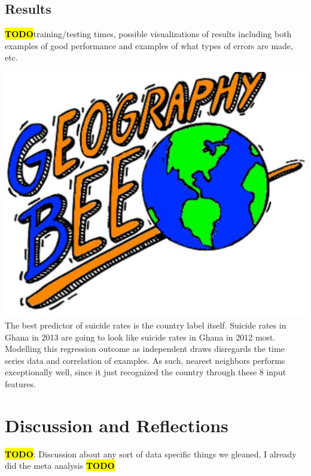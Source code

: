 \documentclass{article}
\newcommand{\TODO}{\textcolor{red}{\textbf{\hl{TODO}}}}
\begin{document}
\begin{multicols}{2}
\subsection{Results}
\TODO training/testing times, possible visualizations of results including both examples of good
performance and examples of what types of errors are made, etc.

\includegraphics[width=\columnwidth]{geo-bee.jpg}
The best predictor of suicide rates is the country label itself. Suicide rates in Ghana in 2013 are going to look like suicide rates in Ghana in 2012 most. Modelling this regression outcome as independent draws disregards the time series data and correlation of examples. As such, nearest neighbors performs exceptionally well, since it just recognized the country through these 8 input features. 


\section{Discussion and Reflections}
\TODO : Discussion about any sort of data specific things we gleaned, I already did the meta analysis \TODO

\end{multicols}
\end{document}
